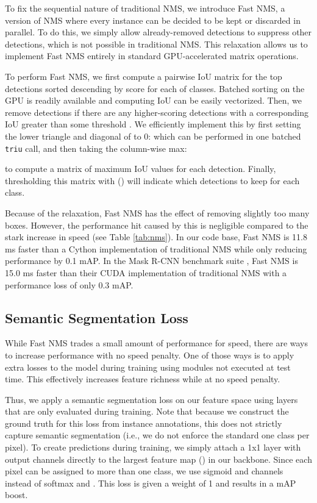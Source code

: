 \documentclass[10pt,journal,compsoc]{IEEEtran}
\begin{document}
To fix the sequential nature of traditional NMS, we introduce Fast NMS, a version of NMS where every instance can be decided to be kept or discarded in parallel. To do this, we simply allow already-removed detections to suppress other detections, which is not possible in traditional NMS. This relaxation allows us to implement Fast NMS entirely in standard GPU-accelerated matrix operations.


To perform Fast NMS, we first compute a  pairwise IoU matrix  for the top  detections sorted descending by score for each of  classes. Batched sorting on the GPU is readily available and computing IoU can be easily vectorized. Then, we remove detections if there are any higher-scoring detections with a corresponding IoU greater than some threshold . We efficiently implement this by first setting the lower triangle and diagonal of  to 0: 
which can be performed in one batched {\tt triu} call, and then taking the column-wise max:
     
to compute a matrix  of maximum IoU values for each detection. Finally, thresholding this matrix with  () will indicate which detections to keep for each class.

Because of the relaxation, Fast NMS has the effect of removing slightly too many boxes. However, the performance hit caused by this is negligible compared to the stark increase in speed (see Table \ref{tab:nms}). In our code base, Fast NMS is 11.8 ms faster than a Cython implementation of traditional NMS while only reducing performance by 0.1 mAP. In the Mask R-CNN benchmark suite \cite{maskrcnn}, Fast NMS is 15.0 ms faster than their CUDA implementation of traditional NMS with a performance loss of only 0.3 mAP.

\subsection{Semantic Segmentation Loss}
While Fast NMS trades a small amount of performance for speed, there are ways to increase performance with no speed penalty. One of those ways is to apply extra losses to the model during training using modules not executed at test time. This effectively increases feature richness while at no speed penalty.

Thus, we apply a semantic segmentation loss on our feature space using layers that are only evaluated during training. Note that because we construct the ground truth for this loss from instance annotations, this does not strictly capture semantic segmentation (i.e., we do not enforce the standard one class per pixel).
To create predictions during training, we simply attach a 1x1  layer with  output channels directly to the largest feature map () in our backbone. Since each pixel can be assigned to more than one class, we use sigmoid and  channels instead of softmax and . This loss is given a weight of 1 and results in a  mAP boost.
\end{document}
